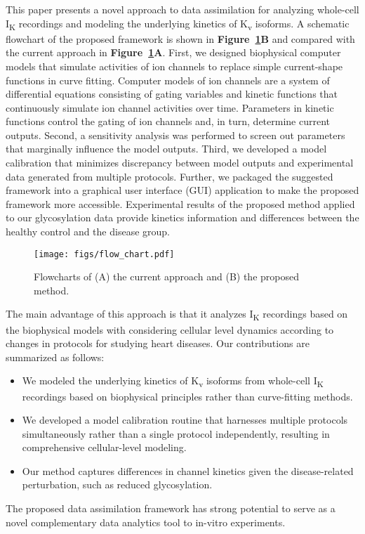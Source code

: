 \documentclass[11pt]{article}
\begin{document}
This paper presents a novel approach to data assimilation for analyzing whole-cell I\textsubscript{K} recordings and modeling the underlying kinetics of K\textsubscript{v} isoforms. A schematic flowchart of the proposed framework is shown in \textbf{Figure~\ref{fig:flow_chart}B} and compared with the current approach in \textbf{Figure~\ref{fig:flow_chart}A}. First, we designed biophysical computer models that simulate activities of ion channels to replace simple current-shape functions in curve fitting. Computer models of ion channels are a system of differential equations consisting of gating variables and kinetic functions that continuously simulate ion channel activities over time. Parameters in kinetic functions control the gating of ion channels and, in turn, determine current outputs. Second, a sensitivity analysis was performed to screen out parameters that marginally influence the model outputs. Third, we developed a model calibration that minimizes discrepancy between model outputs and experimental data generated from multiple protocols. Further, we packaged the suggested framework into a graphical user interface (GUI) application to make the proposed framework more accessible. Experimental results of the proposed method applied to our glycosylation data provide kinetics information and differences between the healthy control and the disease group.
\begin{figure}
    \centering
    \texttt{[image: figs/flow\_chart.pdf]}
    \caption{Flowcharts of (A) the current approach and (B) the proposed method.}
    \label{fig:flow_chart}
\end{figure}

The main advantage of this approach is that it analyzes I\textsubscript{K} recordings based on the biophysical models with considering cellular level dynamics according to changes in protocols for studying heart diseases. Our contributions are summarized as follows:
\begin{itemize}
    \item We modeled the underlying kinetics of K\textsubscript{v} isoforms from whole-cell I\textsubscript{K} recordings based on biophysical principles rather than curve-fitting methods.
    \item We developed a model calibration routine that harnesses multiple protocols simultaneously rather than a single protocol independently, resulting in comprehensive cellular-level modeling.
    \item Our method captures differences in channel kinetics given the disease-related perturbation, such as reduced glycosylation.
\end{itemize}
The proposed data assimilation framework has strong potential to serve as a novel complementary data analytics tool to in-vitro experiments. 
\end{document}
